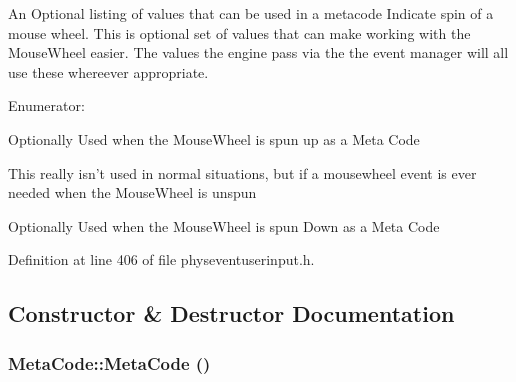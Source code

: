 An Optional listing of values that can be used in a metacode Indicate spin of a mouse wheel. This is optional set of values that can make working with the MouseWheel easier. The values the engine pass via the the event manager will all use these whereever appropriate. \begin{Desc}
\item[Enumerator: ]\par
\begin{description}
\item[{\em 
\hypertarget{classMetaCode_a31155465656363d4ecdf9ce7ae5d7227af0b2479902511454e2018979ee5e39e5}{
MOUSEWHEEL\_\-UP}
\label{d7/d72/classMetaCode_a31155465656363d4ecdf9ce7ae5d7227af0b2479902511454e2018979ee5e39e5}
}]Optionally Used when the MouseWheel is spun up as a Meta Code \item[{\em 
\hypertarget{classMetaCode_a31155465656363d4ecdf9ce7ae5d7227a70b73f42dccd13d9652d83c5f24cd966}{
MOUSEWHEEL\_\-UNCHANGED}
\label{d7/d72/classMetaCode_a31155465656363d4ecdf9ce7ae5d7227a70b73f42dccd13d9652d83c5f24cd966}
}]This really isn't used in normal situations, but if a mousewheel event is ever needed when the MouseWheel is unspun \item[{\em 
\hypertarget{classMetaCode_a31155465656363d4ecdf9ce7ae5d7227a912c43d8503790ded562c0c4a6a62ca7}{
MOUSEWHEEL\_\-DOWN}
\label{d7/d72/classMetaCode_a31155465656363d4ecdf9ce7ae5d7227a912c43d8503790ded562c0c4a6a62ca7}
}]Optionally Used when the MouseWheel is spun Down as a Meta Code \end{description}
\end{Desc}



Definition at line 406 of file physeventuserinput.h.

\subsection{Constructor \& Destructor Documentation}
\hypertarget{classMetaCode_a6d4637b2894e5a2d46577c08259a2416}{
\subsubsection[{MetaCode}]{\setlength{\rightskip}{0pt plus 5cm}MetaCode::MetaCode ()}}
\label{d7/d72/classMetaCode_a6d4637b2894e5a2d46577c08259a2416}


